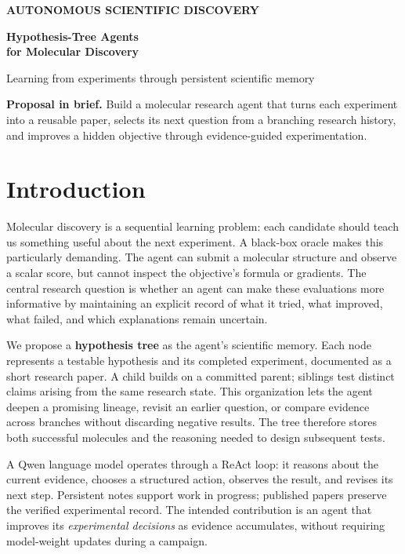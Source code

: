 \documentclass[11pt,a4paper]{article}
\begin{document}
\thispagestyle{fancy}
{\small\sffamily\bfseries\color{accent}AUTONOMOUS SCIENTIFIC DISCOVERY}\par\vspace{7pt}
{\fontsize{27}{30}\selectfont\sffamily\bfseries\color{ink}Hypothesis-Tree Agents\\for Molecular Discovery}\par
\vspace{4pt}
{\large\color{muted}Learning from experiments through persistent scientific memory}\par
\vspace{12pt}
\colorbox{chipgray}{\parbox{\dimexpr\linewidth-2\fboxsep\relax}{\vspace{6pt}\textbf{Proposal in brief.} Build a molecular research agent that turns each experiment into a reusable paper, selects its next question from a branching research history, and improves a hidden objective through evidence-guided experimentation.\vspace{6pt}}}

\section{Introduction}
Molecular discovery is a sequential learning problem: each candidate should teach us something useful about the next experiment. A black-box oracle makes this particularly demanding. The agent can submit a molecular structure and observe a scalar score, but cannot inspect the objective's formula or gradients. The central research question is whether an agent can make these evaluations more informative by maintaining an explicit record of what it tried, what improved, what failed, and which explanations remain uncertain.

We propose a \textbf{hypothesis tree} as the agent's scientific memory. Each node represents a testable hypothesis and its completed experiment, documented as a short research paper. A child builds on a committed parent; siblings test distinct claims arising from the same research state. This organization lets the agent deepen a promising lineage, revisit an earlier question, or compare evidence across branches without discarding negative results. The tree therefore stores both successful molecules and the reasoning needed to design subsequent tests.

A Qwen language model operates through a ReAct loop: it reasons about the current evidence, chooses a structured action, observes the result, and revises its next step. Persistent notes support work in progress; published papers preserve the verified experimental record. The intended contribution is an agent that improves its \emph{experimental decisions} as evidence accumulates, without requiring model-weight updates during a campaign.
\end{document}
